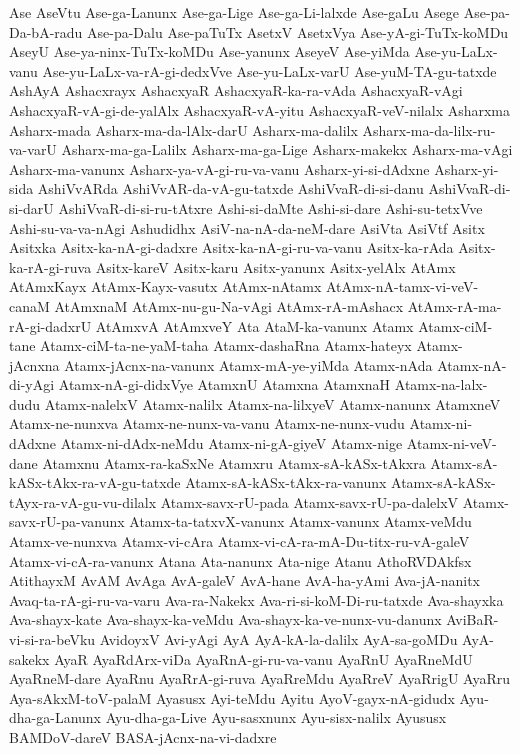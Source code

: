 {Ase
AseVtu
Ase-ga-Lanunx
Ase-ga-Lige
Ase-ga-Li-lalxde
Ase-gaLu
Asege
Ase-pa-Da-bA-radu
Ase-pa-Dalu
Ase-paTuTx
AsetxV
AsetxVya
Ase-yA-gi-TuTx-koMDu
AseyU
Ase-ya-ninx-TuTx-koMDu
Ase-yanunx
AseyeV
Ase-yiMda
Ase-yu-LaLx-vanu
Ase-yu-LaLx-va-rA-gi-dedxVve
Ase-yu-LaLx-varU
Ase-yuM-TA-gu-tatxde
AshAyA
Ashacxrayx
AshacxyaR
AshacxyaR-ka-ra-vAda
AshacxyaR-vAgi
AshacxyaR-vA-gi-de-yalAlx
AshacxyaR-vA-yitu
AshacxyaR-veV-nilalx
Asharxma
Asharx-mada
Asharx-ma-da-lAlx-darU
Asharx-ma-dalilx
Asharx-ma-da-lilx-ru-va-varU
Asharx-ma-ga-Lalilx
Asharx-ma-ga-Lige
Asharx-makekx
Asharx-ma-vAgi
Asharx-ma-vanunx
Asharx-ya-vA-gi-ru-va-vanu
Asharx-yi-si-dAdxne
Asharx-yi-sida
AshiVvARda
AshiVvAR-da-vA-gu-tatxde
AshiVvaR-di-si-danu
AshiVvaR-di-si-darU
AshiVvaR-di-si-ru-tAtxre
Ashi-si-daMte
Ashi-si-dare
Ashi-su-tetxVve
Ashi-su-va-va-nAgi
Ashudidhx
AsiV-na-nA-da-neM-dare
AsiVta
AsiVtf
Asitx
Asitxka
Asitx-ka-nA-gi-dadxre
Asitx-ka-nA-gi-ru-va-vanu
Asitx-ka-rAda
Asitx-ka-rA-gi-ruva
Asitx-kareV
Asitx-karu
Asitx-yanunx
Asitx-yelAlx
AtAmx
AtAmxKayx
AtAmx-Kayx-vasutx
AtAmx-nAtamx
AtAmx-nA-tamx-vi-veV-canaM
AtAmxnaM
AtAmx-nu-gu-Na-vAgi
AtAmx-rA-mAshacx
AtAmx-rA-ma-rA-gi-dadxrU
AtAmxvA
AtAmxveY
Ata
AtaM-ka-vanunx
Atamx
Atamx-ciM-tane
Atamx-ciM-ta-ne-yaM-taha
Atamx-dashaRna
Atamx-hateyx
Atamx-jAcnxna
Atamx-jAcnx-na-vanunx
Atamx-mA-ye-yiMda
Atamx-nAda
Atamx-nA-di-yAgi
Atamx-nA-gi-didxVye
AtamxnU
Atamxna
AtamxnaH
Atamx-na-lalx-dudu
Atamx-nalelxV
Atamx-nalilx
Atamx-na-lilxyeV
Atamx-nanunx
AtamxneV
Atamx-ne-nunxva
Atamx-ne-nunx-va-vanu
Atamx-ne-nunx-vudu
Atamx-ni-dAdxne
Atamx-ni-dAdx-neMdu
Atamx-ni-gA-giyeV
Atamx-nige
Atamx-ni-veV-dane
Atamxnu
Atamx-ra-kaSxNe
Atamxru
Atamx-sA-kASx-tAkxra
Atamx-sA-kASx-tAkx-ra-vA-gu-tatxde
Atamx-sA-kASx-tAkx-ra-vanunx
Atamx-sA-kASx-tAyx-ra-vA-gu-vu-dilalx
Atamx-savx-rU-pada
Atamx-savx-rU-pa-dalelxV
Atamx-savx-rU-pa-vanunx
Atamx-ta-tatxvX-vanunx
Atamx-vanunx
Atamx-veMdu
Atamx-ve-nunxva
Atamx-vi-cAra
Atamx-vi-cA-ra-mA-Du-titx-ru-vA-galeV
Atamx-vi-cA-ra-vanunx
Atana
Ata-nanunx
Ata-nige
Atanu
AthoRVDAkfsx
AtithayxM
AvAM
AvAga
AvA-galeV
AvA-hane
AvA-ha-yAmi
Ava-jA-nanitx
Avaq-ta-rA-gi-ru-va-varu
Ava-ra-Nakekx
Ava-ri-si-koM-Di-ru-tatxde
Ava-shayxka
Ava-shayx-kate
Ava-shayx-ka-veMdu
Ava-shayx-ka-ve-nunx-vu-danunx
AviBaR-vi-si-ra-beVku
AvidoyxV
Avi-yAgi
AyA
AyA-kA-la-dalilx
AyA-sa-goMDu
AyA-sakekx
AyaR
AyaRdArx-viDa
AyaRnA-gi-ru-va-vanu
AyaRnU
AyaRneMdU
AyaRneM-dare
AyaRnu
AyaRrA-gi-ruva
AyaRreMdu
AyaRreV
AyaRrigU
AyaRru
Aya-sAkxM-toV-palaM
Ayasusx
Ayi-teMdu
Ayitu
AyoV-gayx-nA-gidudx
Ayu-dha-ga-Lanunx
Ayu-dha-ga-Live
Ayu-sasxnunx
Ayu-sisx-nalilx
Ayususx
BAMDoV-dareV
BASA-jAcnx-na-vi-dadxre
}
